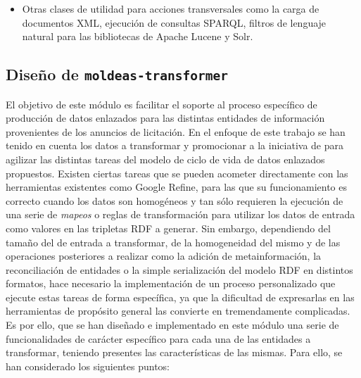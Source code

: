 \begin{itemize}
\item Otras clases de utilidad para acciones transversales como la carga de documentos 
\gls{XML}, ejecución de consultas \gls{SPARQL}, filtros de lenguaje natural para las bibliotecas 
de Apache \gls{Lucene} y \gls{Solr}.

\end{itemize}

\subsection{Diseño de \texttt{moldeas-transformer}}\label{sect:moldeas-transformer}
El objetivo de este módulo es facilitar el soporte al proceso específico 
de producción de datos enlazados para las distintas entidades de información 
provenientes de los anuncios de licitación. En el enfoque de este trabajo 
se han tenido en cuenta los datos a transformar y promocionar a la iniciativa 
de \linkeddata para agilizar las distintas tareas del modelo de ciclo 
de vida de datos enlazados propuestos. Existen ciertas tareas 
que se pueden acometer directamente con las herramientas existentes como 
Google \gls{Refine}, para las que su funcionamiento es correcto cuando 
los datos son homogéneos y tan sólo requieren la ejecución de una serie 
de \textit{mapeos} o reglas de transformación para utilizar los datos 
de entrada como valores en las tripletas \gls{RDF} a generar. Sin embargo, 
dependiendo del tamaño del \dataset de entrada a transformar, de la homogeneidad 
del mismo y de las operaciones posteriores a realizar como la adición de metainformación, 
la reconciliación de entidades o la simple serialización del modelo RDF en distintos 
formatos, hace necesario la implementación de un proceso personalizado que ejecute 
estas tareas de forma específica, ya que la dificultad de expresarlas en las herramientas 
de propósito general las convierte en tremendamente complicadas. Es por ello, que se han diseñado 
e implementado en este módulo una serie de funcionalidades de carácter específico 
para cada una de las entidades a transformar, teniendo presentes las características 
de las mismas. Para ello, se han considerado los siguientes puntos:

